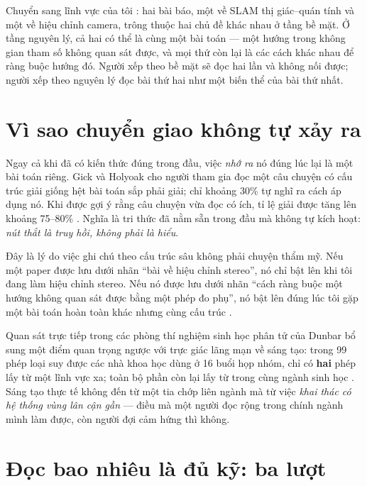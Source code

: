 \documentclass[../hieu-suat.tex]{subfiles}
\begin{document}
\begin{trucgiac}
Chuyển sang lĩnh vực của tôi \nM{}: hai bài báo, một về SLAM thị giác--quán tính và một về hiệu chỉnh camera, trông thuộc hai chủ đề khác nhau ở tầng bề mặt. Ở tầng nguyên lý, cả hai có thể là cùng một bài toán --- một hướng trong không gian tham số không quan sát được, và mọi thứ còn lại là các cách khác nhau để ràng buộc hướng đó. Người xếp theo bề mặt sẽ đọc hai lần và không nối được; người xếp theo nguyên lý đọc bài thứ hai như một biến thể của bài thứ nhất.
\end{trucgiac}

\section{Vì sao chuyển giao không tự xảy ra}

Ngay cả khi đã có kiến thức đúng trong đầu, việc \emph{nhớ ra} nó đúng lúc lại là một bài toán riêng. Gick và Holyoak \cite{gick1980} cho người tham gia đọc một câu chuyện có cấu trúc giải giống hệt bài toán sắp phải giải; chỉ khoảng 30\% tự nghĩ ra cách áp dụng nó. Khi được gợi ý rằng câu chuyện vừa đọc có ích, tỉ lệ giải được tăng lên khoảng 75--80\% \nD{}. Nghĩa là tri thức đã nằm sẵn trong đầu mà không tự kích hoạt: \emph{nút thắt là truy hồi, không phải là hiểu}.

Đây là lý do việc ghi chú theo cấu trúc sâu không phải chuyện thẩm mỹ. Nếu một paper được lưu dưới nhãn ``bài về hiệu chỉnh stereo'', nó chỉ bật lên khi tôi đang làm hiệu chỉnh stereo. Nếu nó được lưu dưới nhãn ``cách ràng buộc một hướng không quan sát được bằng một phép đo phụ'', nó bật lên đúng lúc tôi gặp một bài toán hoàn toàn khác nhưng cùng cấu trúc \nM{}.

Quan sát trực tiếp trong các phòng thí nghiệm sinh học phân tử của Dunbar \cite{dunbar1997} bổ sung một điểm quan trọng ngược với trực giác lãng mạn về sáng tạo: trong 99 phép loại suy được các nhà khoa học dùng ở 16 buổi họp nhóm, chỉ có \textbf{hai} phép lấy từ một lĩnh vực xa; toàn bộ phần còn lại lấy từ trong cùng ngành sinh học \nD{}. Sáng tạo thực tế không đến từ một tia chớp liên ngành mà từ việc \emph{khai thác có hệ thống vùng lân cận gần} --- điều mà một người đọc rộng trong chính ngành mình làm được, còn người đợi cảm hứng thì không.

\section{Đọc bao nhiêu là đủ kỹ: ba lượt}
\end{document}
